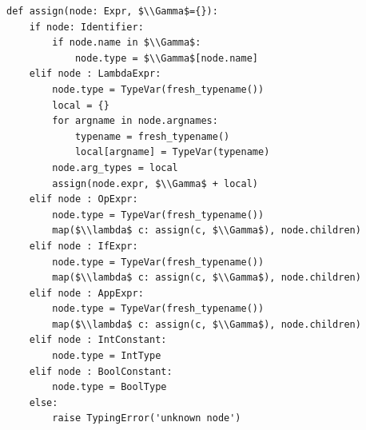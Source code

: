 \documentclass[border=10pt]{standalone}
\begin{document}
\begin{lstlisting}
def assign(node: Expr, $\\Gamma$={}):
    if node: Identifier:
        if node.name in $\\Gamma$:
            node.type = $\\Gamma$[node.name]
    elif node : LambdaExpr:
        node.type = TypeVar(fresh_typename())
        local = {}
        for argname in node.argnames:
            typename = fresh_typename()
            local[argname] = TypeVar(typename)
        node.arg_types = local
        assign(node.expr, $\\Gamma$ + local)
    elif node : OpExpr:
        node.type = TypeVar(fresh_typename())
        map($\\lambda$ c: assign(c, $\\Gamma$), node.children)
    elif node : IfExpr:
        node.type = TypeVar(fresh_typename())
        map($\\lambda$ c: assign(c, $\\Gamma$), node.children)
    elif node : AppExpr:
        node.type = TypeVar(fresh_typename())
        map($\\lambda$ c: assign(c, $\\Gamma$), node.children)
    elif node : IntConstant:
        node.type = IntType
    elif node : BoolConstant:
        node.type = BoolType
    else:
        raise TypingError('unknown node')
\end{lstlisting}
\end{document}
